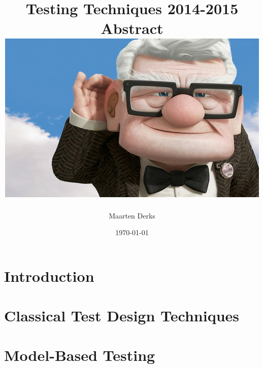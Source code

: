 \documentclass[a4paper]{report}
\title{
	{Testing Techniques 2014-2015}\\
	{\large Abstract}\\
	{\includegraphics{up.jpg}}
}
\author{Maarten Derks}
\date{\today}
\begin{document}
	
	\maketitle
	
	\tableofcontents
	
	\chapter{Introduction}
		
	
	\chapter{Classical Test Design Techniques}
			
	
	\chapter{Model-Based Testing}
\end{document}
